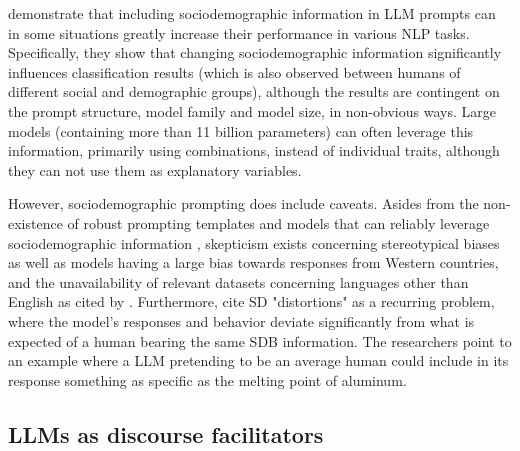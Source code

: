 \citet{beck-etal-2024-sensitivity} demonstrate that including sociodemographic information in LLM prompts can in some situations greatly increase their performance in various \ac{NLP} tasks. Specifically, they show that changing sociodemographic information significantly influences classification results (which is also observed between humans of different social and demographic groups), although the results are contingent on the prompt structure, model family and model size, in non-obvious ways. Large models (containing more than 11 billion parameters) can often leverage this information, primarily using combinations, instead of individual traits, although they can not use them as explanatory variables.

However, sociodemographic prompting does include caveats. Asides from the non-existence of robust prompting templates and models that can reliably leverage sociodemographic information \cite{beck-etal-2024-sensitivity}, skepticism exists concerning stereotypical biases \cite{cheng-etal-2023-marked, deshpande-etal-2023-toxicity} as well as models having a large bias towards responses from Western countries, and the unavailability of relevant datasets concerning languages other than English \cite{pmlr-v202-santurkar23a, durmus2024measuringrepresentationsubjectiveglobal, santy-etal-2023-nlpositionality} as cited by \citet{beck-etal-2024-sensitivity}. Furthermore, \citet{aher2023usinglargelanguagemodels} cite SD "distortions" as a recurring problem, where the model's responses and behavior deviate significantly from what is expected of a human bearing the same \ac{SDB} information. The researchers point to an example where a LLM pretending to be an average human could include in its response something as specific as the melting point of aluminum.


\subsection{LLMs as discourse facilitators}
\label{sec:related:discource}


